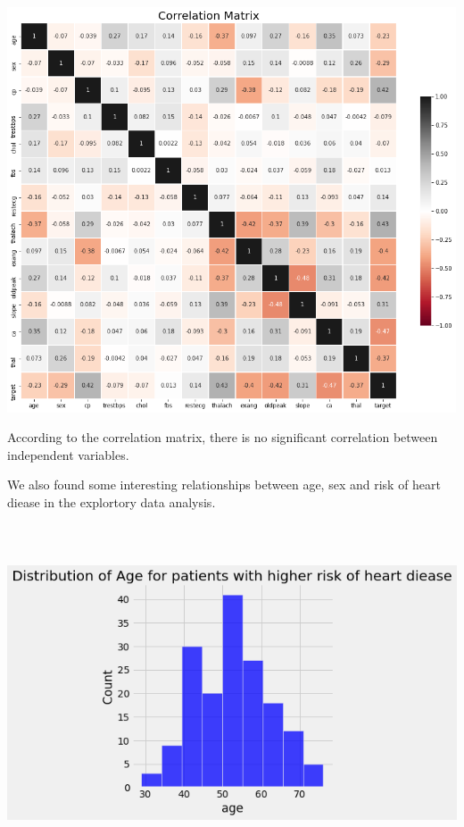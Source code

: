 \documentclass[12pt]{article}
\begin{document}
\begin{center}
    \includegraphics[width=\textwidth, height=12cm, keepaspectratio]{images/image5.png}
\end{center}


\par According to the correlation matrix, there is no significant correlation between independent variables.
\par We  also found some interesting relationships between age, sex and risk of heart diease in the explortory data analysis.
\begin{center}
    \includegraphics[width=\textwidth, height=10cm, keepaspectratio]{images/image2.png}
\end{center}
\end{document}
